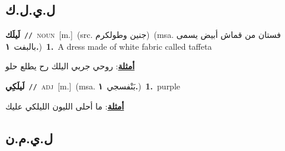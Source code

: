 \documentclass[10pt,a4paper,twoside]{article} %
\begin{document}
\begin{multicols}{2}
\vspace{-3mm}
\subsection*{\color{blue}\foreignlanguage{arabic}{ل.ي.ل.ك}\color{blue}{}} 

{\setlength\topsep{0pt}\textbf{\foreignlanguage{arabic}{لَيلَك}}\ {\color{gray}\texttt{//}\color{black}}\ \textsc{noun}\ [m.]\ (src. \color{gray}\foreignlanguage{arabic}{جنين وطولكرم}\color{black})\ \color{gray}(msa. \foreignlanguage{arabic}{فستان من قماش أبيض يسمى بالبفت}~\foreignlanguage{arabic}{\textbf{١.}})\color{black}\ \textbf{1.}~A dress made of white fabric called taffeta\  \begin{flushright}\color{gray}\foreignlanguage{arabic}{\textbf{\underline{\foreignlanguage{arabic}{أمثلة}}}: روحي جربي اليلك رح يطلع حلو}\end{flushright}\color{black}} \vspace{2mm}

{\setlength\topsep{0pt}\textbf{\foreignlanguage{arabic}{لَيلَكِي}}\ {\color{gray}\texttt{//}\color{black}}\ \textsc{adj}\ [m.]\ \color{gray}(msa. \foreignlanguage{arabic}{بَنْفسجي}~\foreignlanguage{arabic}{\textbf{١.}})\color{black}\ \textbf{1.}~purple\  \begin{flushright}\color{gray}\foreignlanguage{arabic}{\textbf{\underline{\foreignlanguage{arabic}{أمثلة}}}: ما أحلى الليون الليلكي عليك}\end{flushright}\color{black}} \vspace{2mm}

\vspace{-3mm}
\subsection*{\color{blue}\foreignlanguage{arabic}{ل.ي.م.ن}\color{blue}{}} 


\end{multicols}
\end{document}
